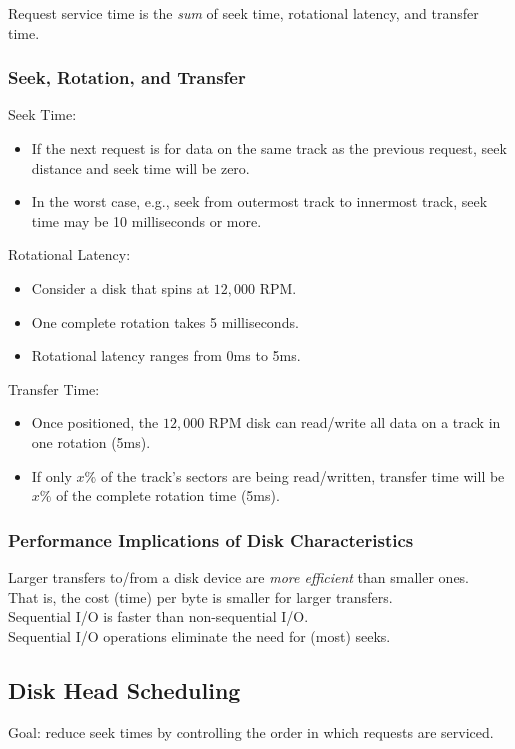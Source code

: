 \documentclass[12pt]{article}
\theoremstyle{plain}
\theoremstyle{definition}
\begin{document}
Request service time is the \emph{sum} of seek time, rotational latency, and transfer time.

\subsubsection{Seek, Rotation, and Transfer}
Seek Time:
\begin{itemize}
  \item If the next request is for data on the same track as the previous request, seek distance and seek time will be zero.
  \item In the worst case, e.g., seek from outermost track to innermost track, seek time may be 10 milliseconds or more.
\end{itemize}
\medskip
Rotational Latency:
\begin{itemize}
  \item Consider a disk that spins at $12,000$ RPM.
  \item One complete rotation takes 5 milliseconds.
  \item Rotational latency ranges from 0ms to 5ms.
\end{itemize}
\medskip
Transfer Time:
\begin{itemize}
  \item Once positioned, the $12,000$ RPM disk can read/write all data on a track in one rotation (5ms).
  \item If only $x\%$ of the track's sectors are being read/written, transfer time will be $x\%$ of the complete rotation time (5ms).
\end{itemize}

\subsubsection{Performance Implications of Disk Characteristics}
Larger transfers to/from a disk device are \emph{more efficient} than smaller ones. \\
That is, the cost (time) per byte is smaller for larger transfers. \\

Sequential I/O is faster than non-sequential I/O. \\
Sequential I/O operations eliminate the need for (most) seeks.

\subsection{Disk Head Scheduling}
Goal: reduce seek times by controlling the order in which requests are serviced. \\
\end{document}
